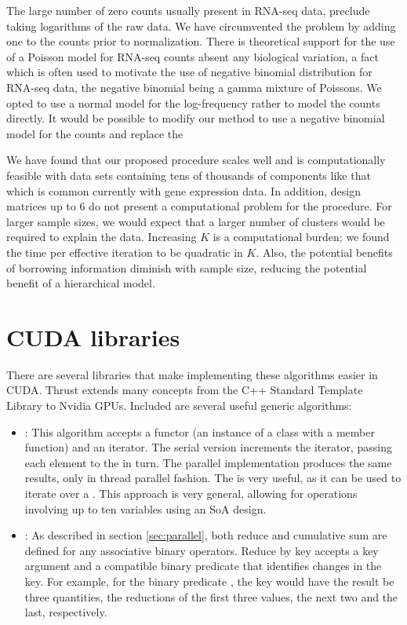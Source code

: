 {The large number of zero counts usually present in RNA-seq data, preclude taking logarithms of the raw data. We have circumvented the problem by adding one to the counts prior to normalization. There is theoretical support for the use of a Poisson model for RNA-seq counts absent any biological variation, a fact which is often used to motivate the use of negative binomial distribution for RNA-seq data, the negative binomial being a gamma mixture of Poissons. We opted to use a normal model for the log-frequency rather to model the counts directly. It would be possible to modify our method to use a negative binomial model for the counts and replace the  

We have found that our proposed procedure scales well and is computationally feasible with data sets containing tens of thousands of components like that which is common currently with gene expression data. In addition, design matrices up to 6 do not present a computational problem for the procedure. For larger sample sizes, we would expect that a larger number of clusters would be required to explain the data. Increasing $K$ is a computational burden; we found the time per effective iteration to be quadratic in $K$. Also, the potential benefits of borrowing information diminish with sample size, reducing the potential benefit of a hierarchical model.

\appendix
\section{CUDA libraries}
There are several libraries that make implementing these algorithms easier in CUDA. Thrust \citep{thrust} extends many concepts from the C++ Standard Template Library to Nvidia GPUs. Included are several useful generic algorithms:
\begin{itemize}
\item {}: This algorithm accepts a functor (an
  instance of a class with a member  function)
  and an iterator. The serial version increments the iterator, passing
  each element to the  in turn. The parallel implementation
  produces the same results, only in thread parallel fashion. The
   is very useful, as it can be used
  to iterate
  over a . This approach is very general, allowing
  for operations involving up to ten variables using an SoA
  design.

\item {}: As described in section
  \ref{sec:parallel}, both reduce and cumulative sum are defined for any associative binary operators. Reduce by key accepts a key argument and a compatible binary predicate that identifies changes in the key. For example, for the binary predicate , the key  would have the result be three quantities, the reductions of the first three values, the next two and the last, respectively.


\end{itemize}}
